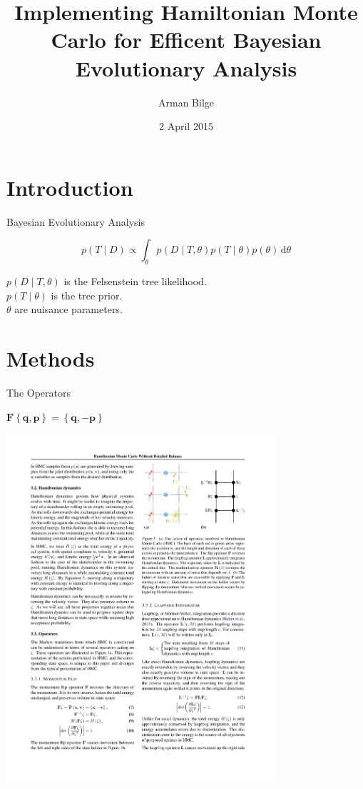 \documentclass{beamer}
\title[HMC]{Implementing Hamiltonian Monte Carlo for Efficent Bayesian Evolutionary Analysis}
\author{Arman Bilge}
\date{2 April 2015}
\newcommand{\dd}{\, \text{d}}
\renewcommand{\vec}[1]{\ensuremath{\mathbf{#1}}}
\newcommand{\op}[1]{\ensuremath{\mathbf{#1}}}
\begin{document}
    \frame{\titlepage}
    
    \section{Introduction}
    
    \begin{frame}{Bayesian Evolutionary Analysis}
        
        \begin{equation}
            p\left(T \mid D\right)
                \propto \int_\theta p\left(D \mid T,\theta\right)
                p\left(T \mid \theta\right) p\left(\theta\right) \dd\theta
        \end{equation}
        
        $p\left(D \mid T,\theta\right)$ is the Felsenstein tree likelihood. \\
        $p\left(T \mid \theta\right)$ is the tree prior. \\
        $\theta$ are nuisance parameters.
        
    \end{frame}
    
    \section{Methods}
    
    \begin{frame}{The Operators}
        
        \begin{definition}
            $\op{F}\left\{\vec{q},\vec{p}\right\} = \left\{\vec{q},-\vec{p}\right\}$
        \end{definition}
        
        \vfill
        
        \centering
        \includegraphics[width=0.75\textwidth]{F.pdf}
        
    \end{frame}
\end{document}
